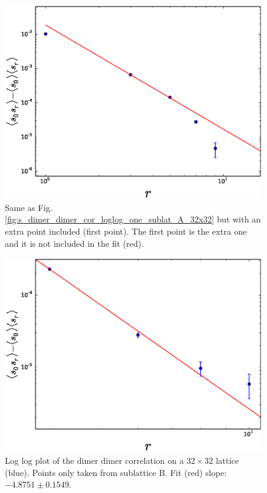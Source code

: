 \documentclass[aps,floatfix,11pt]{revtex4-1}
\begin{document}
\begin{figure}[h]
    \centering
    \includegraphics[width=8.5 cm]{s_dimer_dimer_cor_loglog_one_sublat_A_32x32_extra_pnt}
    \caption{Same as Fig. \ref{fig:s_dimer_dimer_cor_loglog_one_sublat_A_32x32} but with an extra
        point included (first point). The first point is the extra one and it is not included in the fit (red).
    \label{fig:s_dimer_dimer_cor_loglog_one_sublat_A_32x32_extra_pnt}}
\end{figure}

\begin{figure}[h]
    \centering
    \includegraphics[width=8.5 cm]{s_dimer_dimer_cor_loglog_one_sublat_B_32x32}
    \caption{Log log plot of the dimer dimer correlation on a $32\times32$ lattice (blue). 
        Points only taken from sublattice B. Fit (red) slope: $-4.8751 \pm 0.1549$.
    \label{fig:s_dimer_dimer_cor_loglog_one_sublat_B_32x32}}
\end{figure}
\end{document}

